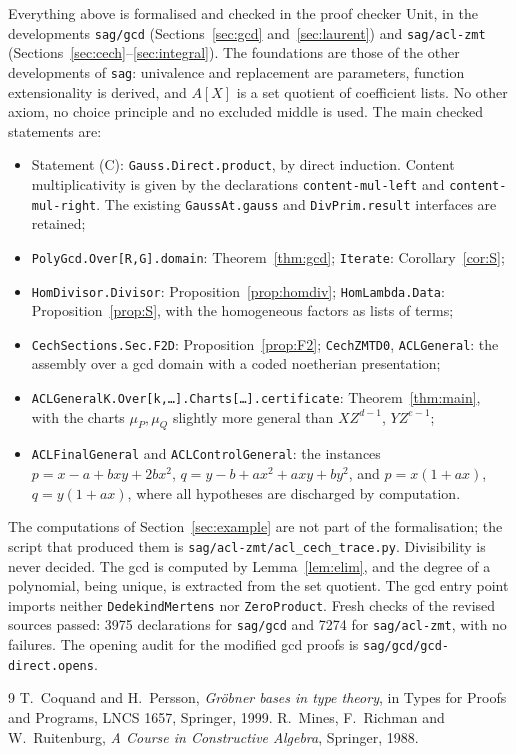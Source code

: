 \documentclass[11pt]{amsart}
\theoremstyle{definition}
\theoremstyle{remark}
\begin{document}
Everything above is formalised and checked in the proof checker Unit, in
the developments \texttt{sag/gcd} (Sections~\ref{sec:gcd}
and~\ref{sec:laurent}) and \texttt{sag/acl-zmt}
(Sections~\ref{sec:cech}--\ref{sec:integral}). The foundations are those of
the other developments of \texttt{sag}: univalence and replacement are
parameters, function extensionality is derived, and $A[X]$ is a set
quotient of coefficient lists. No other axiom, no choice principle and no
excluded middle is used. The main checked statements are:
\begin{itemize}
\item Statement (C): \texttt{Gauss.Direct.product}, by direct induction.
  Content multiplicativity is given by the declarations
  \texttt{content-mul-left} and \texttt{content-mul-right}.
  The existing \texttt{GaussAt.gauss} and
  \texttt{DivPrim.result} interfaces are retained;
\item \texttt{PolyGcd.Over[R,G].domain}: Theorem~\ref{thm:gcd};
  \texttt{Iterate}: Corollary~\ref{cor:S};
\item \texttt{HomDivisor.Divisor}: Proposition~\ref{prop:homdiv};
  \texttt{HomLambda.Data}: Proposition~\ref{prop:S}, with the homogeneous
  factors as lists of terms;
\item \texttt{CechSections.Sec.F2D}: Proposition~\ref{prop:F2};
  \texttt{CechZMTD0}, \texttt{ACLGeneral}: the assembly over a gcd domain
  with a coded noetherian presentation;
\item \texttt{ACLGeneralK.Over[k,\dots].Charts[\dots].certificate}:
  Theorem~\ref{thm:main}, with the charts $\mu_P,\mu_Q$ slightly more
  general than $XZ^{d-1}$, $YZ^{e-1}$;
\item \texttt{ACLFinalGeneral} and \texttt{ACLControlGeneral}: the
  instances $p=x-a+bxy+2bx^2$, $q=y-b+ax^2+axy+by^2$, and
  $p=x(1+ax)$, $q=y(1+ax)$, where all hypotheses are discharged by
  computation.
\end{itemize}
The computations of Section~\ref{sec:example} are not part of the
formalisation; the script that produced them is
\texttt{sag/acl-zmt/acl\_cech\_trace.py}. Divisibility is never decided. The gcd is computed by
Lemma~\ref{lem:elim}, and the degree of a polynomial, being unique, is
extracted from the set quotient. The gcd entry point imports neither
\texttt{DedekindMertens} nor \texttt{ZeroProduct}. Fresh checks of the
revised sources passed: 3975 declarations for \texttt{sag/gcd} and
7274 for \texttt{sag/acl-zmt}, with no failures. The opening audit for
the modified gcd proofs is \texttt{sag/gcd/gcd-direct.opens}.

\begin{thebibliography}{9}
 T.~Coquand and H.~Persson, \emph{Gröbner bases in type
  theory}, in Types for Proofs and Programs, LNCS 1657, Springer, 1999.
 R.~Mines, F.~Richman and W.~Ruitenburg, \emph{A Course in
  Constructive Algebra}, Springer, 1988.
\end{thebibliography}
\end{document}
